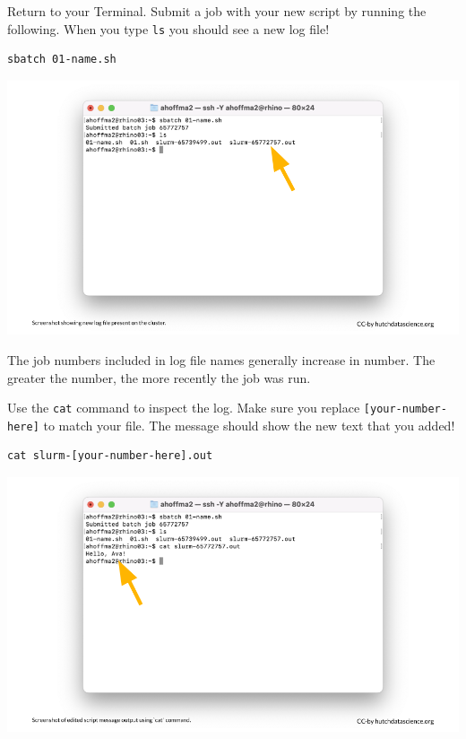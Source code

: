 \documentclass[
]{book}
\begin{document}
Return to your Terminal. Submit a job with your new script by running the following. When you type \texttt{ls} you should see a new log file!

\begin{verbatim}
sbatch 01-name.sh
\end{verbatim}

\includegraphics[width=1\linewidth]{resources/images/06-upload-download_files/figure-latex//1BQxrVYdKZTbpCaF-i_q9w7s9x034lEXpQZDU-Sl09cs_gff2211b72f_1_0}

The job numbers included in log file names generally increase in number. The greater the number, the more recently the job was run.

Use the \texttt{cat} command to inspect the log. Make sure you replace \texttt{{[}your-number-here{]}} to match your file. The message should show the new text that you added!

\begin{verbatim}
cat slurm-[your-number-here].out
\end{verbatim}

\includegraphics[width=1\linewidth]{resources/images/06-upload-download_files/figure-latex//1BQxrVYdKZTbpCaF-i_q9w7s9x034lEXpQZDU-Sl09cs_gff2211b72f_1_6}
\end{document}
